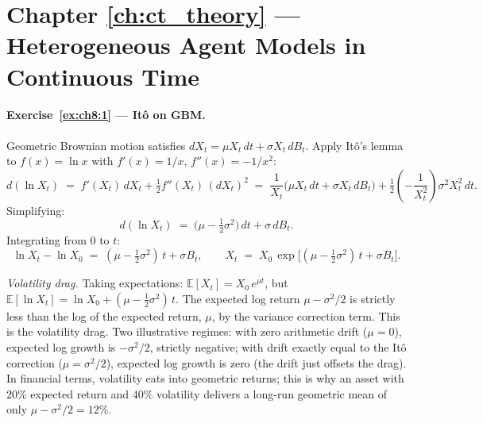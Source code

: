\documentclass[11pt,a4paper]{report}
\begin{document}
\section{Chapter \ref{ch:ct_theory} --- Heterogeneous Agent Models in Continuous Time}
\label{sol:ch8}

\paragraph{Exercise~\ref{ex:ch8:1} --- Itô on GBM.}
Geometric Brownian motion satisfies $dX_t = \mu X_t\,dt + \sigma X_t\,dB_t$.  Apply Itô's lemma to $f(x) = \ln x$ with $f'(x) = 1/x$, $f''(x) = -1/x^2$:
\[
   d(\ln X_t) \;=\; f'(X_t)\,dX_t + \tfrac{1}{2} f''(X_t)\,(dX_t)^2
   \;=\; \frac{1}{X_t}\bigl(\mu X_t\,dt + \sigma X_t\,dB_t\bigr) + \tfrac{1}{2}\!\left(-\frac{1}{X_t^2}\right)\sigma^2 X_t^2\,dt.
\]
Simplifying:
\[
   d(\ln X_t) \;=\; \bigl(\mu - \tfrac{1}{2}\sigma^2\bigr)\,dt + \sigma\,dB_t.
\]
Integrating from $0$ to $t$:
\[
   \ln X_t - \ln X_0 \;=\; (\mu - \tfrac{1}{2}\sigma^2)\,t + \sigma B_t,
   \qquad
   X_t \;=\; X_0\,\exp\!\bigl[(\mu - \tfrac{1}{2}\sigma^2)\,t + \sigma B_t\bigr].
\]

\emph{Volatility drag.}  Taking expectations: $\mathbb{E}[X_t] = X_0\,e^{\mu t}$, but $\mathbb{E}[\ln X_t] = \ln X_0 + (\mu - \tfrac{1}{2}\sigma^2)\,t$.  The expected log return $\mu - \sigma^2/2$ is strictly less than the log of the expected return, $\mu$, by the variance correction term.  This is the volatility drag.  Two illustrative regimes: with zero arithmetic drift ($\mu = 0$), expected log growth is $-\sigma^2/2$, strictly negative; with drift exactly equal to the It\^o correction ($\mu = \sigma^2/2$), expected log growth is zero (the drift just offsets the drag).  In financial terms, volatility eats into geometric returns; this is why an asset with $20\%$ expected return and $40\%$ volatility delivers a long-run geometric mean of only $\mu - \sigma^2/2 = 12\%$.
\end{document}
